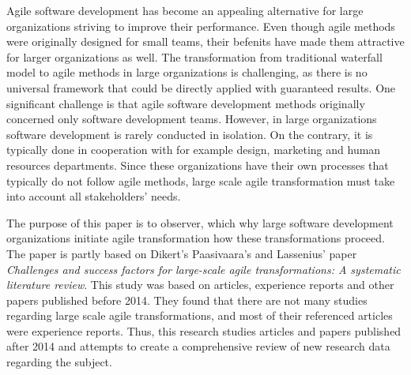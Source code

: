 Agile software development has become an appealing alternative for
large organizations striving to improve their performance. Even
though agile methods were originally designed for small teams, their
befenits have made them attractive for larger organizations as well.
The transformation from traditional waterfall model to agile methods
in large organizations is challenging, as there is no universal
framework that could be directly applied with guaranteed results.
One significant challenge is that agile software development methods
originally concerned only software development teams. However, in
large organizations software development is rarely conducted in
isolation. On the contrary, it is typically done in cooperation with for
example design, marketing and human resources departments. Since these
organizations have their own processes that typically do not follow
agile methods, large scale agile transformation must take into account
all stakeholders' needs.

The purpose of this paper is to observer, which why large software
development organizations initiate agile transformation how these
transformations proceed. The paper is partly based on Dikert's
Paasivaara's and Lassenius' paper \textit{Challenges and success
factors for large-scale agile transformations: A systematic literature
review}. This study was based on articles, experience reports and
other papers published before 2014. They found that there are not many
studies regarding large scale agile transformations, and most of their
referenced articles were experience reports. Thus, this research studies
articles and papers published after 2014 and attempts to create a
comprehensive review of new research data regarding the subject.
